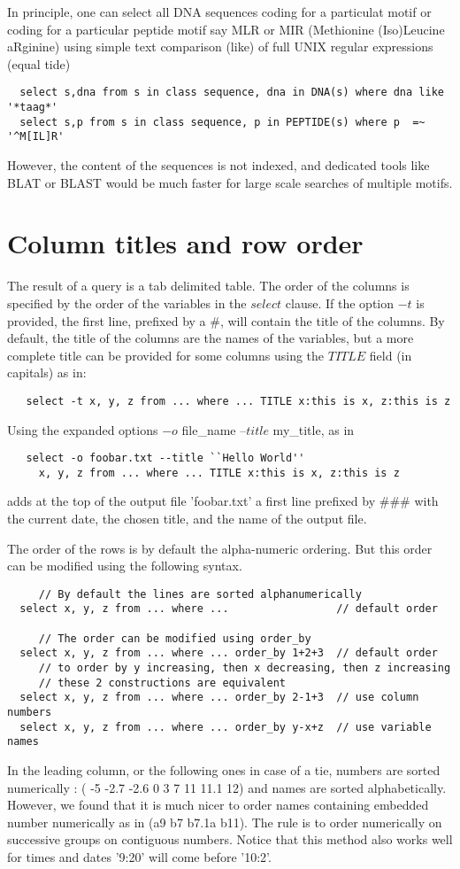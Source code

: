 \documentclass[11pt]{article}
\newcommand{\BL}{\begin{lstlisting}}
\begin{document}
In principle, one can select all DNA sequences coding for a particulat motif
or coding for a particular peptide motif
say MLR or MIR (Methionine (Iso)Leucine aRginine) using
simple text comparison (like) of full UNIX
regular expressions (equal tide)
\BL
  select s,dna from s in class sequence, dna in DNA(s) where dna like '*taag*'
  select s,p from s in class sequence, p in PEPTIDE(s) where p  =~ '^M[IL]R'
\end{lstlisting}
However, the content of the sequences is not indexed, and dedicated tools
like BLAT or BLAST would be much faster for large scale searches
of multiple motifs.

\section{Column titles and row order}

The result of a query is a tab delimited table. 
The order of the columns is specified by the order of the variables in the $select$ clause.
If the option $-$$t$ is provided, the first line, prefixed by a \#, will contain the title of the columns.
By default, the title of the columns are the names of the variables, but a more 
complete title can be provided for some columns using the $TITLE$ field (in capitals)  as in:
\BL
   select -t x, y, z from ... where ... TITLE x:this is x, z:this is z
\end{lstlisting}
Using the expanded options $-o$ file\_name --$title$ my\_title, as in 
\BL
   select -o foobar.txt --title ``Hello World''
     x, y, z from ... where ... TITLE x:this is x, z:this is z
\end{lstlisting}
adds at the top of the output file 'foobar.txt'
a first line prefixed by $\#\#\#$ with the current date, the chosen title, and the name of the output file.

The order of the rows is by default the alpha-numeric ordering.
But this order can be modified using the following syntax.

\BL
     // By default the lines are sorted alphanumerically
  select x, y, z from ... where ...                 // default order

     // The order can be modified using order_by
  select x, y, z from ... where ... order_by 1+2+3  // default order
     // to order by y increasing, then x decreasing, then z increasing
     // these 2 constructions are equivalent
  select x, y, z from ... where ... order_by 2-1+3  // use column numbers
  select x, y, z from ... where ... order_by y-x+z  // use variable names
\end{lstlisting}
In the leading column, or the following ones in case of a tie,
numbers are sorted numerically : ( -5 -2.7 -2.6 0 3 7 11 11.1 12) 
and names are sorted alphabetically. However, we found\cite {DTM94} that it is much nicer to
order names containing embedded number numerically as in (a9 b7 b7.1a b11). 
The rule is to order numerically on successive groups on contiguous numbers.
Notice that this method also works well for times and dates
'9:20' will come before '10:2'.
\end{document}
